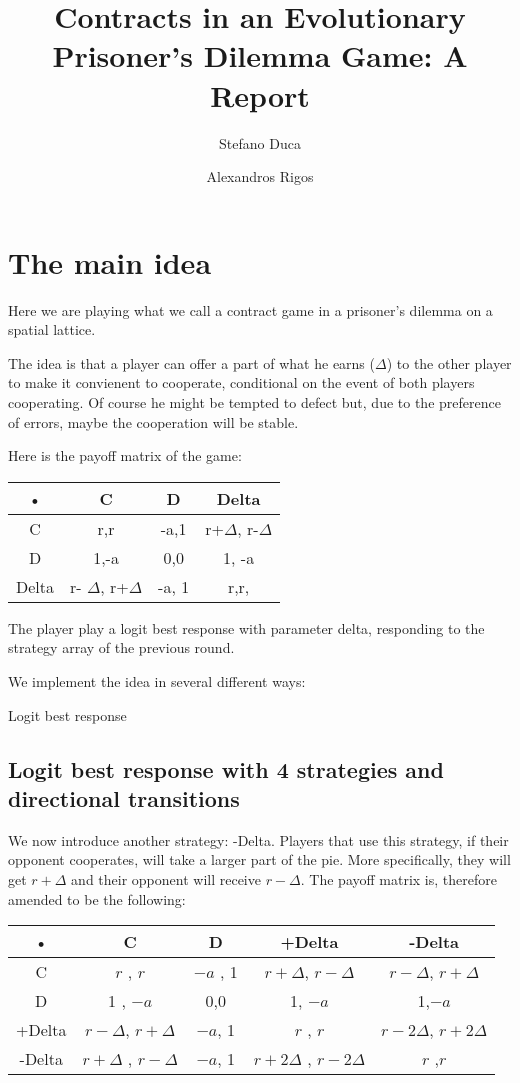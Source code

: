 \documentclass{article}
\author{Stefano Duca \and Alexandros Rigos}
\title{Contracts in an Evolutionary Prisoner's Dilemma Game: A Report}
\begin{document}
\maketitle

\section{The main idea}
Here we are playing what we call a contract game in a prisoner's dilemma on a spatial lattice.

The idea is that a player can offer a part of what he earns ($\Delta$) to the other player to make it convienent to cooperate, conditional on the event of both players cooperating. Of course he might be tempted to defect but, due to the preference of errors, maybe the cooperation will be stable.

Here is the payoff matrix of the game:
\begin{center}
\begin{tabular}{|c|c|c|c|}
\hline 
• & C & D & Delta \\ 
\hline 
C & r,r & -a,1 & r+$\Delta$, r-$\Delta$ \\ 
\hline 
D & 1,-a & 0,0 & 1, -a \\ 
\hline 
Delta & r- $\Delta$, r+$\Delta$ & -a, 1 & r,r, \\ 
\hline 
\end{tabular} 
\end{center}

The player play a logit best response with parameter delta, responding to the strategy array of the previous round.

We implement the idea in several different ways:

Logit best response

\subsection{Logit best response with 4 strategies and directional transitions}
We now introduce another strategy: -Delta. Players that use this strategy, if their opponent cooperates, will take a larger part of the pie. More specifically, they will get $r+\Delta$ and their opponent will receive $r-\Delta$. The payoff matrix is, therefore amended to be the following:
\begin{center}
\begin{tabular}{|c|c|c|c|c|}
\hline 
• & C & D &+Delta & -Delta  \\ 
\hline 
C & $r$ , $r$ & $-a$ , 1 & $r+\Delta$, $r-\Delta$ & $r-\Delta$, $r+\Delta$ \\ 
\hline 
D & 1 , $-a$ & 0,0 & 1, $-a$ & 1,$-a$\\ 
\hline 
+Delta & $r -\Delta$, $r+\Delta$ & $-a$, 1 & $r$ , $r$& $r-2\Delta$, $r+2\Delta$ \\ 
\hline 
-Delta & $r+\Delta$ , $r-\Delta$ & $-a$, 1 & $r+2\Delta$ , $r-2\Delta$ & $r$ ,$ r$\\ 
\hline 
\end{tabular} 
\end{center}
\end{document}
